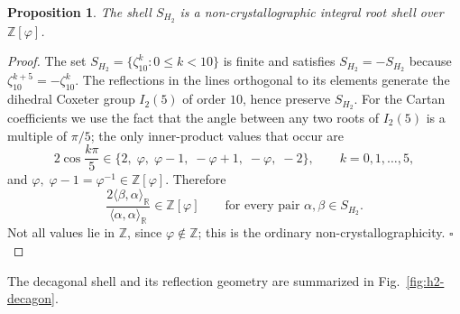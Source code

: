 \documentclass[12pt,oneside,english]{amsart}
\numberwithin{equation}{section}
\numberwithin{figure}{section}
\numberwithin{table}{section}
\theoremstyle{plain}
\newtheorem{proposition}[theorem]{Proposition}
\theoremstyle{definition}
\theoremstyle{remark}
\newcommand{\ZZ}{\mathbb Z}
\newcommand{\RR}{\mathbb R}
\newcommand{\Zphi}{\mathbb Z[\varphi]}
\begin{document}
\begin{proposition}
\label{prop:h2-cartan}
The shell \(S_{H_2}\) is a non-crystallographic integral root shell over \(\Zphi\).
\end{proposition}

\begin{proof}
The set \(S_{H_2}=\{\zeta_{10}^k:0\leq k<10\}\) is finite and satisfies \(S_{H_2}=-S_{H_2}\) because \(\zeta_{10}^{k+5}=-\zeta_{10}^k\). The reflections in the lines orthogonal to its elements generate the dihedral Coxeter group \(I_2(5)\) of order \(10\), hence preserve \(S_{H_2}\). For the Cartan coefficients we use the fact that the angle between any two roots of \(I_2(5)\) is a multiple of \(\pi/5\); the only inner-product values that occur are
\begin{equation}
2\cos\frac{k\pi}{5}\in\{2,\;\varphi,\;\varphi-1,\;-\varphi+1,\;-\varphi,\;-2\},\qquad k=0,1,\ldots,5,
\end{equation}
and \(\varphi,\;\varphi-1=\varphi^{-1}\in\Zphi\). Therefore
\begin{equation}
\frac{2\langle\beta,\alpha\rangle_{\RR}}{\langle\alpha,\alpha\rangle_{\RR}}\in\Zphi
\qquad\text{for every pair }\alpha,\beta\in S_{H_2}.
\label{eq:h2-cartan}
\end{equation}
Not all values lie in \(\ZZ\), since \(\varphi\notin\ZZ\); this is the ordinary non-crystallographicity. \(\square\)
\end{proof}

The decagonal shell and its reflection geometry are summarized in Fig.~\ref{fig:h2-decagon}.
\end{document}
